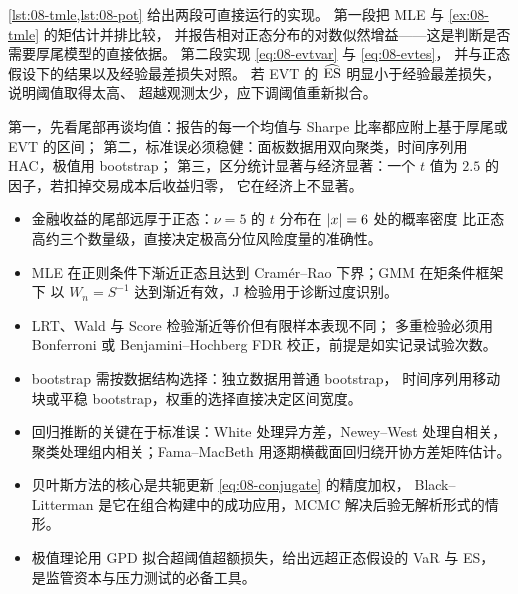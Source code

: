\cref{lst:08-tmle,lst:08-pot} 给出两段可直接运行的实现。
第一段把 MLE 与 \cref{ex:08-tmle} 的矩估计并排比较，
并报告相对正态分布的对数似然增益——这是判断是否需要厚尾模型的直接依据。
第二段实现 \cref{eq:08-evtvar} 与 \cref{eq:08-evtes}，
并与正态假设下的结果以及经验最差损失对照。
若 EVT 的 $\widehat{\operatorname{ES}}$ 明显小于经验最差损失，说明阈值取得太高、
超越观测太少，应下调阈值重新拟合。

\begin{keybox}[统计推断在金融数据上的三条纪律]
第一，先看尾部再谈均值：报告的每一个均值与 Sharpe 比率都应附上基于厚尾或 EVT 的区间；
第二，标准误必须稳健：面板数据用双向聚类，时间序列用 HAC，极值用 bootstrap；
第三，区分统计显著与经济显著：一个 $t$ 值为 $2.5$ 的因子，若扣掉交易成本后收益归零，
它在经济上不显著。
\end{keybox}

\begin{summarybox}
\begin{itemize}[leftmargin=*]
  \item 金融收益的尾部远厚于正态：$\nu = 5$ 的 $t$ 分布在 $\left\lvert x \right\rvert=6$ 处的概率密度
  比正态高约三个数量级，直接决定极高分位风险度量的准确性。
  \item MLE 在正则条件下渐近正态且达到 Cramér--Rao 下界；GMM 在矩条件框架下
  以 $W_n = S^{-1}$ 达到渐近有效，J 检验用于诊断过度识别。
  \item LRT、Wald 与 Score 检验渐近等价但有限样本表现不同；
  多重检验必须用 Bonferroni 或 Benjamini--Hochberg FDR 校正，前提是如实记录试验次数。
  \item bootstrap 需按数据结构选择：独立数据用普通 bootstrap，
  时间序列用移动块或平稳 bootstrap，权重的选择直接决定区间宽度。
  \item 回归推断的关键在于标准误：White 处理异方差，Newey--West 处理自相关，
  聚类处理组内相关；Fama--MacBeth 用逐期横截面回归绕开协方差矩阵估计。
  \item 贝叶斯方法的核心是共轭更新 \cref{eq:08-conjugate} 的精度加权，
  Black--Litterman 是它在组合构建中的成功应用，MCMC 解决后验无解析形式的情形。
  \item 极值理论用 GPD 拟合超阈值超额损失，给出远超正态假设的 VaR 与 ES，
  是监管资本与压力测试的必备工具。
\end{itemize}
\end{summarybox}

